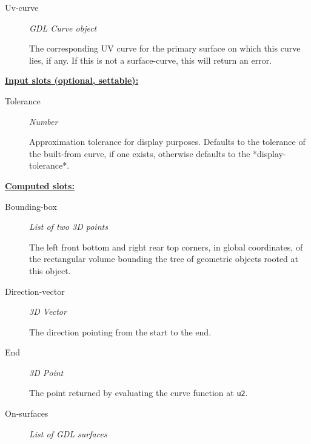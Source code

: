 \documentclass [11pt]{book}
\begin{document}
\begin{itemize}
\begin{description}
\item [Uv-curve]
\emph{GDL Curve object}

 The corresponding UV curve for the primary surface on which this curve lies, if any. If
this is not a surface-curve, this will return an error.




\end{description}






\textbf{
\underline{Input slots (optional, settable):}}

\begin{description}

\item [Tolerance]
\emph{Number}

 Approximation tolerance for display purposes. Defaults to the tolerance of the
built-from curve, if one exists, otherwise defaults to the *display-tolerance*.




\end{description}






\textbf{
\underline{Computed slots:}}

\begin{description}

\item [Bounding-box]
\emph{List of two 3D points}

 The left front bottom and right rear top corners, in global coordinates,
of the rectangular volume bounding the tree of geometric objects rooted at this object.




\item [Direction-vector]
\emph{3D Vector}

 The direction pointing from the start to the end.




\item [End]
\emph{3D Point}

 The point returned by evaluating the curve function at \texttt{u2}.




\item [On-surfaces]
\emph{List of GDL surfaces}


\end{description}
\end{itemize}
\end{document}
